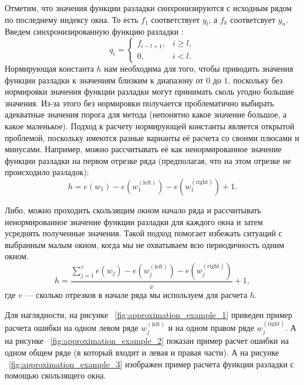 \documentclass[%
12pt,
master,  %
natbib,      %
subf,        %
substylefile = spbu.rtx,
href,        %
colorlinks,  %
]{disser}
\begin{document}
Отметим, что значения функции разладки синхронизируются с исходным рядом по последнему индексу окна. То есть $f_1$ соответствует $y_l$, а $f_k $ соответсвует $y_n$. Введем синхронизированную функцию разладки :
\begin{equation*}
q_i =
	\begin{cases}
		f_{i-l+1}, & i \geq l, \\
		0, & i < l.
	\end{cases}
\end{equation*}
Нормирующая константа $h$ нам необходима для того, чтобы приводить значения функции разладки к значениям близким к диапазону от $0$ до $1$, поскольку без нормировки значения функции разладки могут принимать сколь угодно большие значения. Из-за этого без нормировки получается проблематично выбирать адекватные значения порога для метода (непонятно какое значение большое, а какое маленькое). Подход к расчету нормирующей константы является открытой проблемой, поскольку имеются разные варианты её расчета со своими плюсами и минусами.
Например, можно рассчитывать её как ненормированное значение функции разладки на первом отрезке ряда (предполагая, что на этом отрезке не происходило разладок):
\begin{equation*} 
h = e(w_1) - e(w_1^{\mathrm{(left)}}) - e(w_1^{\mathrm{(right)}}) + 1. 
\end{equation*}

Либо, можно проходить скользящим окном начало ряда и рассчитывать ненормированное значение функции разладки для каждого окна и затем усреднять полученные значения. Такой подход помогает избежать ситуаций с выбранным малым окном, когда мы не охватываем всю периодичность одним окном.
\begin{equation*} 
h = \frac{\sum_{j=1}^{v}e(w_j) - e(w_j^{\mathrm{(left)}}) - e(w_j^{\mathrm{(right)}})}{v} + 1, 
\end{equation*}
где $v$ --- сколько отрезков в начале ряда мы используем для расчета $h$.


Для наглядности, на рисунке ~\ref{fig:approximation_example_1} приведен пример расчета ошибки на одном левом ряде $ w_j^{\mathrm{(left)}} $ и на одном правом ряде $ w_j^{\mathrm{(right)}} $. А на рисунке ~\ref{fig:approximation_example_2} показан пример расчет ошибки на одном общем ряде (в который входит и левая и правая части). А на рисунке ~\ref{fig:approximation_example_3} изображен пример расчета функции разладки с помощью скользящего окна.
\end{document}
